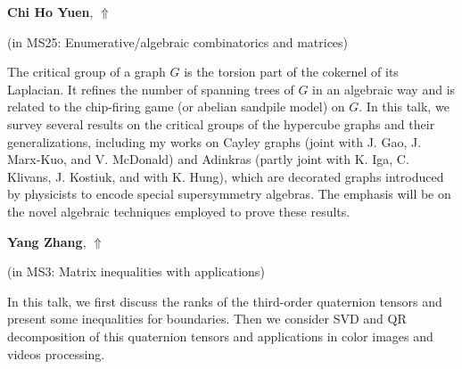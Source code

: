 \documentclass[ILAS2025-program.tex]{subfiles}
\begin{document}
\hypertarget{down0184}{}\begin{ilasabstract}
    
\textbf{Chi Ho Yuen},  \hfill \hyperlink{up0184}{$\Uparrow$}
    
    
(in {\color{mstitle}MS25: Enumerative/algebraic combinatorics and matrices})
        
\mtskip
    The critical group of a graph $G$ is the torsion part of the cokernel of its Laplacian. It refines the number of spanning trees of $G$ in an algebraic way and is related to the chip-firing game (or abelian sandpile model) on $G$. In this talk, we survey several results on the critical groups of the hypercube graphs and their generalizations, including my works on Cayley graphs (joint with J. Gao, J. Marx-Kuo, and V. McDonald) and Adinkras (partly joint with K. Iga, C. Klivans, J. Kostiuk, and with K. Hung), which are decorated graphs introduced by physicists to encode special supersymmetry algebras. The emphasis will be on the novel algebraic techniques employed to prove these results.
\end{ilasabstract}
    

\hypertarget{down0146}{}\begin{ilasabstract}
    
\textbf{Yang Zhang},  \hfill \hyperlink{up0146}{$\Uparrow$}
    
    
(in {\color{mstitle}MS3: Matrix inequalities with applications})
        
\mtskip
    In this talk, we first discuss the ranks of the third-order quaternion tensors and present some inequalities for boundaries. Then we consider SVD and QR decomposition of this quaternion tensors and applications in color images and videos processing. 
\end{ilasabstract}
    
\end{document}

